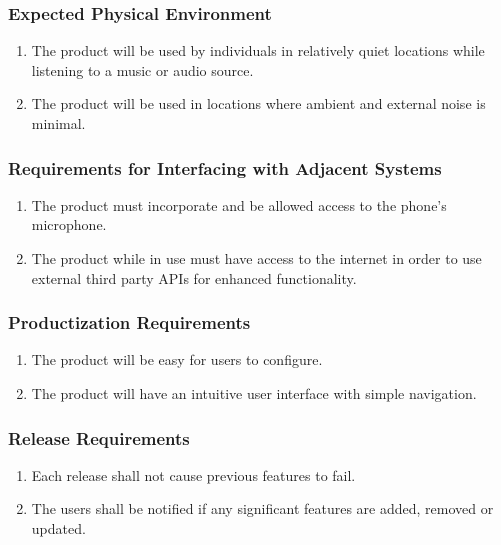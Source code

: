 \documentclass[]{article}
\begin{document}
\subsubsection{Expected Physical Environment}
\label{ssub:expected_physical_environment}
\begin{enumerate}[{OE}1. ]
	\item  The product will be used by individuals in relatively quiet locations while listening to a music or audio source.
	\item The product will be used in locations where ambient and external noise is minimal.

\end{enumerate}

\subsubsection{Requirements for Interfacing with Adjacent Systems}
\label{ssub:requirements_for_interfacing_with_adjacent_systems}
\begin{enumerate}[{OE}1. ]
	\item The product must incorporate and be allowed access to the phone’s microphone.
	\item The product while in use must have access to the internet in order to use external third party APIs for enhanced functionality.

\end{enumerate}

\subsubsection{Productization Requirements}
\label{ssub:productization_requirements}
\begin{enumerate}[{OE}1. ]
	\item The product will be easy for users to configure.
	\item The product will have an intuitive user interface with simple navigation.
\end{enumerate}

\subsubsection{Release Requirements}
\label{ssub:release_requirements}
\begin{enumerate}[{OE}1. ]
	\item Each release shall not cause previous features to fail.
	\item The users shall be notified if any significant features are added, removed or updated.
\end{enumerate}
\end{document}
